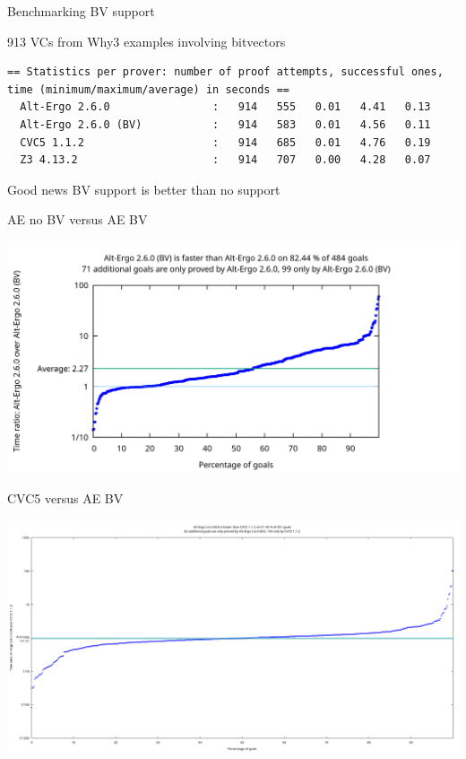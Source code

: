 \documentclass[aspectratio=169]{beamer}
\begin{document}
\begin{frame}[fragile]{Benchmarking BV support}

  913 VCs from Why3 examples involving bitvectors

\begin{verbatim}
== Statistics per prover: number of proof attempts, successful ones, time (minimum/maximum/average) in seconds ==
  Alt-Ergo 2.6.0                :   914   555   0.01   4.41   0.13
  Alt-Ergo 2.6.0 (BV)           :   914   583   0.01   4.56   0.11
  CVC5 1.1.2                    :   914   685   0.01   4.76   0.19
  Z3 4.13.2                     :   914   707   0.00   4.28   0.07
\end{verbatim}

  \begin{block}{Good news}
    BV support is better than no support
  \end{block}

\end{frame}

\begin{frame}{AE no BV versus AE BV}

  \includegraphics[width=\textwidth]{AEvsAEBV.png}

\end{frame}

\begin{frame}{CVC5 versus AE BV}

  \includegraphics[width=\textwidth]{AEBVvsCVC5.png}

\end{frame}
\end{document}
